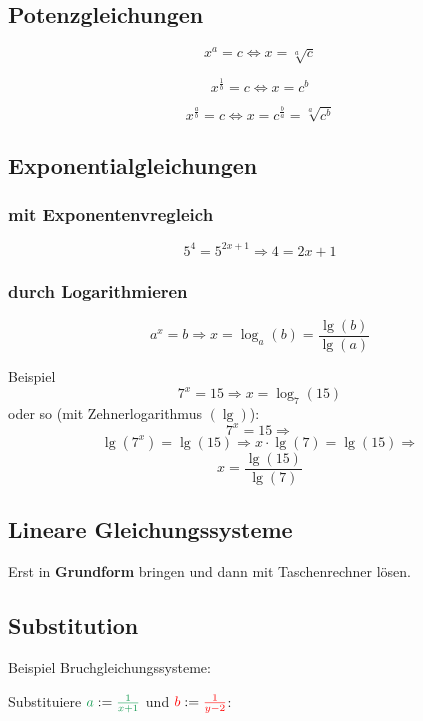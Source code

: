 \begin{multicols}{2}
\subsection*{Potenzgleichungen}

$$x^a=c \Leftrightarrow x=\sqrt[a]{c}$$

$$x^\frac1b=c \Leftrightarrow x=c^b$$




$$x^{\frac{a}b} = c \Leftrightarrow{}
x=c^{\frac{b}a} = \sqrt[a]{c^b}$$
\forceCB
\subsection*{Exponentialgleichungen}
\subsubsection*{mit Exponentenvregleich}

$$5^4 = 5^{2x+1} \Longrightarrow  4=2x+1$$

\subsubsection*{durch Logarithmieren}
$$a^x=b \Rightarrow{} x=\log_a(b) = \frac{\lg(b)}{\lg(a)}$$

Beispiel
$$7^x=15 \Rightarrow x=\log_7(15)$$
oder so (mit Zehnerlogarithmus $(\lg)$):
$$7^x=15 \Rightarrow$$
$$\lg(7^x) = \lg(15) \Rightarrow x\cdot{}\lg(7) = \lg(15) \Rightarrow$$
$$x=\frac{\lg(15)}{\lg(7)}$$




\subsection*{Lineare Gleichungssysteme}
Erst in \textbf{Grundform} bringen und dann
mit Taschenrechner lösen.

\subsection*{Substitution}
Beispiel Bruchgleichungssysteme:

Substituiere
${\color{ForestGreen}a}:={\color{ForestGreen}\frac1{x+1}}$ und
${\color{red}b} : ={\color{red}\frac1{y-2}}$:



\end{multicols}
